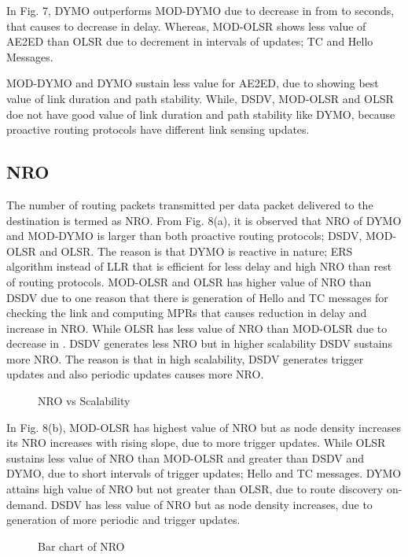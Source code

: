 \documentclass[journal]{IEEEtran}
\begin{document}
In Fig. 7, DYMO outperforms MOD-DYMO due to decrease in  from  to  seconds, that causes to decrease in delay. Whereas, MOD-OLSR shows less value of AE2ED than OLSR due to decrement in intervals of updates; TC and Hello Messages.

MOD-DYMO and DYMO sustain less value for AE2ED, due to showing best value of link duration and path stability. While, DSDV, MOD-OLSR and OLSR doe not have good value of link duration and path stability like DYMO, because proactive routing protocols have different link sensing updates.

\subsection{NRO}
The number of routing packets transmitted per data packet delivered to the destination is termed as NRO. From Fig. 8(a), it is observed that NRO of DYMO and MOD-DYMO is larger than both proactive routing protocols; DSDV, MOD-OLSR and OLSR. The reason is that DYMO is reactive in nature; ERS algorithm instead of LLR that is efficient for less delay and high NRO than rest of routing protocols. MOD-OLSR and OLSR has higher value of NRO than DSDV due to one reason that there is generation of Hello and TC messages for checking the link and computing MPRs that causes reduction in delay and increase in NRO. While OLSR has less value of NRO than MOD-OLSR due to decrease in . DSDV generates less NRO but in higher scalability DSDV sustains more NRO. The reason is that in high scalability, DSDV generates trigger updates and also periodic updates causes more NRO.

\begin{figure}[h]
  \centering
 \caption{NRO vs Scalability}
\end{figure}

In Fig. 8(b), MOD-OLSR has highest value of NRO but as node density increases its NRO increases with rising slope, due to more trigger updates. While OLSR sustains less value of NRO than MOD-OLSR and greater than DSDV and DYMO, due to short intervals of trigger updates; Hello and TC messages. DYMO attains high value of NRO but not greater than OLSR, due to route discovery on-demand. DSDV has less value of NRO but as node density increases, due to generation of more periodic and trigger updates.

\begin{figure}[h]
  \centering
 \caption{Bar chart of NRO}
\end{figure}
\end{document}
